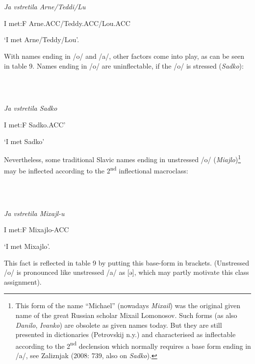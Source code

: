 \documentclass[output=paper]{langscibook}
\begin{document}
\ea%
    \label{ex:key:3}
    \gll \\
         \\
    \glt
    \z %

         \textit{Ja vstretila Arne/Teddi/Lu} 

I met:F Arne.ACC/Teddy.ACC/Lou.ACC

‘I met Arne/Teddy/Lou’.

With names ending in /o/ and /a/, other factors come into play, as can be seen in table 9. Names ending in /o/ are uninflectable, if the /o/ is stressed (\textit{Sadko}):

\ea%
    \label{ex:key:4}
    \gll \\
         \\
    \glt
    \z %

         \textit{Ja vstretila Sadko} 

I met:F Sadko.ACC’

‘I met Sadko’

Nevertheless, some traditional Slavic names ending in unstressed /o/ (\textit{Miajlo})\footnote{ \textrm{This form of the name “Michael” (nowadays} \textrm{\textit{Mixail}}\textrm{) was the original given name of the great Russian scholar Mixail Lomonosov. Such forms (as also} \textrm{\textit{Danilo}}, \textrm{\textit{Ivanko}}\textrm{) are obsolete as given names today. But they are still presented in dictionaries (Petrovskij n.y.) and characterised as inflectable according to the 2}\textrm{\textsuperscript{nd}} \textrm{declension which normally requires a base form ending in /a/, see Zaliznjak (2008: 739, also on} \textrm{\textit{Sadko}}).} may be inflected according to the 2\textsuperscript{nd} inflectional macroclass:

\ea%
    \label{ex:key:5}
    \gll \\
         \\
    \glt
    \z %

         \textit{Ja vstretila Mixajl-u} 

I met:F Mixajlo-ACC

‘I met Mixajlo’. 

This fact is reflected in table 9 by putting this base-form in brackets. (Unstressed /o/ is pronounced like unstressed /a/ as [ə], which may partly motivate this class assignment). 
\end{document}
